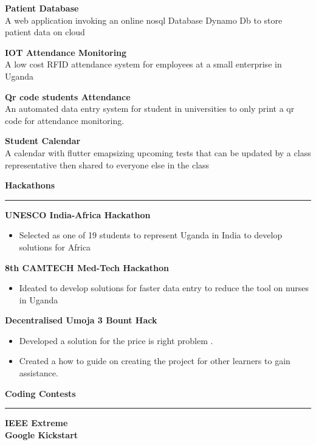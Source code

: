 \documentclass[a4paper]{article}
\begin{document}
\begin{minipage}[t]{0.5\textwidth}
        {\bf Patient Database}\\
        A web application invoking an online nosql Database Dynamo Db to store patient data on cloud

        {\bf IOT Attendance Monitoring}\\
        A low cost RFID attendance system for employees at a small enterprise in Uganda

        {\bf Qr code students Attendance}\\
        An automated data entry system for student in universities to only print a qr code for attendance monitoring.

        {\bf Student Calendar}\\
        A calendar with flutter emapsizing upcoming tests that can be updated by a class representative then shared to everyone else in the class

        {\Large\bf Hackathons}
        \hrule
        {\bf UNESCO India-Africa Hackathon}\\
        \begin{itemize}
            \item Selected as one of 19 students to represent Uganda in India to develop solutions for Africa
        \end{itemize}

        {\bf 8th CAMTECH Med-Tech Hackathon}\\
        \begin{itemize}
            \item Ideated to develop solutions for faster data entry to reduce the tool on nurses in Uganda
        \end{itemize}
        {\bf Decentralised Umoja 3 Bount Hack}\\
        \begin{itemize}
            \item Developed a solution for the price is right problem .
            \item Created a how to guide on creating the project for other learners to gain assistance.
        \end{itemize}
        {\Large\bf Coding Contests}
        \hrule
        {\bf IEEE Extreme}\\
        {\bf Google Kickstart}\\

    \end{minipage}
\end{document}
